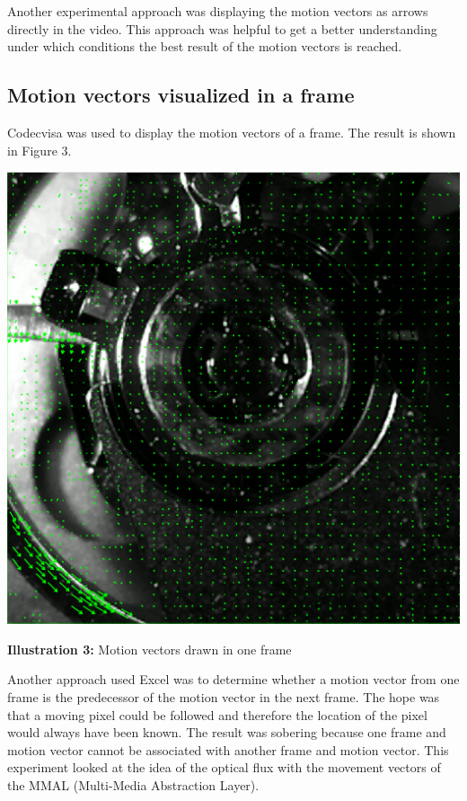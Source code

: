 \documentclass[12pt, a4paper]{report}
\begin{document}
\bigskip

Another experimental approach was displaying the motion vectors as arrows directly in the video. This approach was helpful to get a better understanding under which conditions the best result of the motion vectors is reached.
\pagebreak

\subsection{Motion vectors visualized in a frame}
Codecvisa was used to display the motion vectors of a frame.
The result is shown in Figure 3.
\bigskip
\noindent
\begin{center}
\includegraphics[scale=0.3]{Images/motion_vectors.png}

{\bf Illustration 3:}  Motion vectors drawn in one frame
\end{center}
\bigskip

Another approach used Excel was to determine whether a motion vector from one frame is the predecessor of the motion vector in the next frame.
The hope was that a moving pixel could be followed and therefore the location of the pixel would always have been known.
The result was sobering because one frame and motion vector cannot be associated with another frame and motion vector.
This experiment looked at the idea of the optical flux with the movement vectors of the MMAL (Multi-Media Abstraction Layer).
\end{document}
